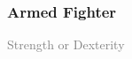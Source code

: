 %

%
\subsubsection{Armed Fighter} \label{feat::armedfighter}
\small{\textcolor{gray}{Strength or Dexterity}}

